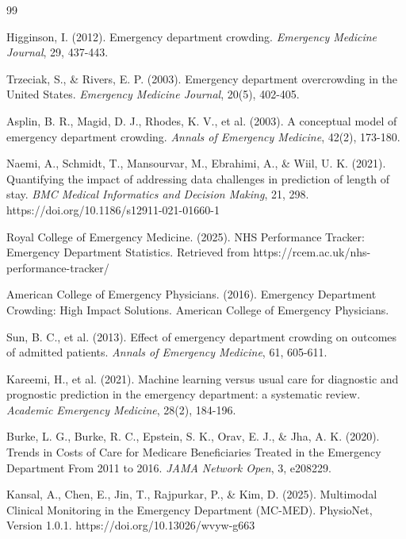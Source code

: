 \documentclass[harvard,article]{frontiersinFPHY_FAMS}
\begin{document}
\begin{thebibliography}{99}

 Higginson, I. (2012). Emergency department crowding. \textit{Emergency Medicine Journal}, 29, 437-443.

 Trzeciak, S., \& Rivers, E. P. (2003). Emergency department overcrowding in the United States. \textit{Emergency Medicine Journal}, 20(5), 402-405.

 Asplin, B. R., Magid, D. J., Rhodes, K. V., et al. (2003). A conceptual model of emergency department crowding. \textit{Annals of Emergency Medicine}, 42(2), 173-180.

 Naemi, A., Schmidt, T., Mansourvar, M., Ebrahimi, A., \& Wiil, U. K. (2021). Quantifying the impact of addressing data challenges in prediction of length of stay. \textit{BMC Medical Informatics and Decision Making}, 21, 298. https://doi.org/10.1186/s12911-021-01660-1

 Royal College of Emergency Medicine. (2025). NHS Performance Tracker: Emergency Department Statistics. Retrieved from https://rcem.ac.uk/nhs-performance-tracker/

 American College of Emergency Physicians. (2016). Emergency Department Crowding: High Impact Solutions. American College of Emergency Physicians.

 Sun, B. C., et al. (2013). Effect of emergency department crowding on outcomes of admitted patients. \textit{Annals of Emergency Medicine}, 61, 605-611.

 Kareemi, H., et al. (2021). Machine learning versus usual care for diagnostic and prognostic prediction in the emergency department: a systematic review. \textit{Academic Emergency Medicine}, 28(2), 184-196.

 Burke, L. G., Burke, R. C., Epstein, S. K., Orav, E. J., \& Jha, A. K. (2020). Trends in Costs of Care for Medicare Beneficiaries Treated in the Emergency Department From 2011 to 2016. \textit{JAMA Network Open}, 3, e208229.

 Kansal, A., Chen, E., Jin, T., Rajpurkar, P., \& Kim, D. (2025). Multimodal Clinical Monitoring in the Emergency Department (MC-MED). PhysioNet, Version 1.0.1. https://doi.org/10.13026/wvyw-g663


\end{thebibliography}
\end{document}
